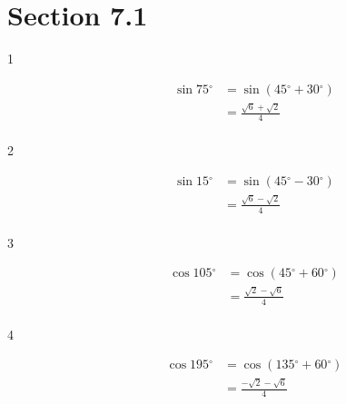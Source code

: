 \documentclass{exam}
\newcommand{\dg}{\ensuremath{^\circ}}
\begin{document}
  \fi

  \ifprintanswers
    \section{Section 7.1}
    \begin{description}

      \item[1] 
        \begin{align*}
          \sin 75 \dg & = \sin (45 \dg + 30 \dg) \\
                      & = \boxed{ \frac{\sqrt{6} + \sqrt{2}}{4} } \\
        \end{align*}

      \item[2] 
        \begin{align*}
          \sin 15 \dg & = \sin (45 \dg - 30 \dg) \\
                      & = \boxed{ \frac{\sqrt{6} - \sqrt{2}}{4} } \\
        \end{align*}

      \item[3] 
        \begin{align*}
          \cos 105 \dg & = \cos (45 \dg + 60 \dg) \\
                      & = \boxed{ \frac{\sqrt{2} - \sqrt{6}}{4} } \\
        \end{align*}

      \item[4] 
        \begin{align*}
          \cos 195 \dg & = \cos (135 \dg + 60 \dg) \\
                      & = \boxed{ \frac{- \sqrt{2} - \sqrt{6}}{4} } \\
        \end{align*}


\end{description}
\end{document}
